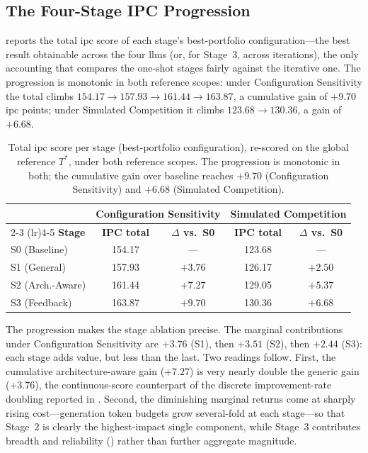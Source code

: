 \subsection{The Four-Stage IPC Progression}
\label{sec:results:cross_stage:progression}

 reports the total \gls{ipc} score of each stage's best-portfolio configuration---the best result obtainable across the four \glspl{llm} (or, for Stage~3, across iterations), the only accounting that compares the one-shot stages fairly against the iterative one. The progression is monotonic in both reference scopes: under Configuration Sensitivity the total climbs $154.17 \rightarrow 157.93 \rightarrow 161.44 \rightarrow 163.87$, a cumulative gain of $+9.70$ \gls{ipc} points; under Simulated Competition it climbs $123.68 \rightarrow 130.36$, a gain of $+6.68$.

\begin{table}[htbp]
  \centering
  \caption{Total \gls{ipc} score per stage (best-portfolio configuration), re-scored on the global reference $T^*$, under both reference scopes. The progression is monotonic in both; the cumulative gain over baseline reaches $+9.70$ (Configuration Sensitivity) and $+6.68$ (Simulated Competition).}
  \label{tab:cs_progression}
  \small
  \begin{tabular}{l c c c c}
    \toprule
    & \multicolumn{2}{c}{\textbf{Configuration Sensitivity}} & \multicolumn{2}{c}{\textbf{Simulated Competition}} \\
    \cmidrule(lr){2-3} \cmidrule(lr){4-5}
    \textbf{Stage} & \textbf{IPC total} & \textbf{$\Delta$ vs.\ S0} & \textbf{IPC total} & \textbf{$\Delta$ vs.\ S0} \\
    \midrule
    S0 (Baseline)       & 154.17 & ---     & 123.68 & ---     \\
    S1 (General)        & 157.93 & $+3.76$ & 126.17 & $+2.50$ \\
    S2 (Arch.-Aware)    & 161.44 & $+7.27$ & 129.05 & $+5.37$ \\
    S3 (Feedback)       & 163.87 & $+9.70$ & 130.36 & $+6.68$ \\
    \bottomrule
  \end{tabular}
\end{table}

The progression makes the stage ablation precise. The marginal contributions under Configuration Sensitivity are $+3.76$ (S1), then $+3.51$ (S2), then $+2.44$ (S3): each stage adds value, but less than the last. Two readings follow. First, the cumulative architecture-aware gain ($+7.27$) is very nearly double the generic gain ($+3.76$), the continuous-score counterpart of the discrete improvement-rate doubling reported in . Second, the diminishing marginal returns come at sharply rising cost---generation token budgets grow several-fold at each stage---so that Stage~2 is clearly the highest-impact single component, while Stage~3 contributes breadth and reliability () rather than further aggregate magnitude.

